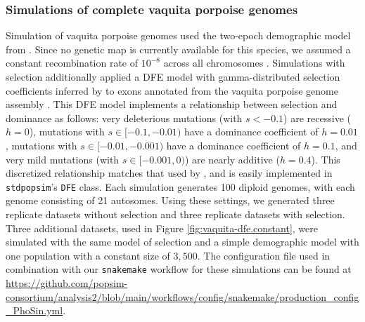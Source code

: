\documentclass[hidelinks]{article}
\newcommand{\stdpopsim}{\texttt{stdpopsim}\xspace}
\newcommand{\snakemake}{\texttt{snakemake}\xspace}
\begin{document}
    \subsubsection*{Simulations of complete vaquita porpoise genomes}
    Simulation of vaquita porpoise genomes used
    the two-epoch demographic model from \citet[\stdpopsim label \texttt{Vaquita2Epoch\_1R22}]{robinson2022critically}.
    Since no genetic map is currently available for this species, we assumed a constant recombination rate of $10^{-8}$
    across all chromosomes \citep{morin2021}.
    Simulations with selection additionally applied a DFE model with gamma-distributed selection coefficients inferred by
    \citet[\stdpopsim label \texttt{Gamma\_R22}]{robinson2022critically} to exons annotated from the vaquita porpoise genome assembly
    \citet[\stdpopsim label \texttt{Phocoena\_sinus.mPhoSin1.pri.110\_exons}]{morin2021}.
    This DFE model implements a relationship between selection and dominance as follows:
    very deleterious mutations (with $s<-0.1$) are recessive ($h=0$),
    mutations with $s\in [-0.1,-0.01)$ have a dominance coefficient of $h=0.01$,
    mutations with $s\in [-0.01,-0.001)$ have a dominance coefficient of $h=0.1$,
    and very mild mutations (with $s\in [-0.001,0)$) are nearly additive ($h=0.4$).
    This discretized relationship matches that used by \textcite{robinson2022critically},
    and is easily implemented in \stdpopsim's \texttt{DFE} class.
    Each simulation generates 100 diploid genomes,
    with each genome consisting of 21 autosomes.
    Using these settings, we generated three replicate datasets without selection
    and three replicate datasets with selection.
    Three additional datasets, used in Figure \ref{fig:vaquita-dfe.constant},
    were simulated with the same model of selection and a simple demographic model with one population with a constant size of $3,500$.
    The configuration file used in combination with our \snakemake workflow
    for these simulations can be found at
    \url{https://github.com/popsim-consortium/analysis2/blob/main/workflows/config/snakemake/production_config_PhoSin.yml}.
\end{document}
